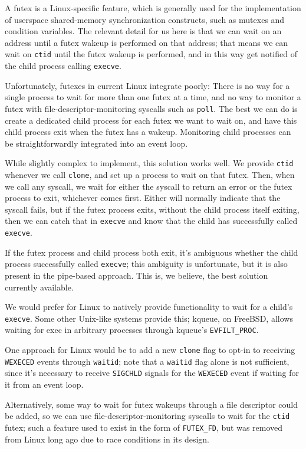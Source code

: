 \documentclass[sigplan]{acmart}
\begin{document}
A futex is a Linux-specific feature,
which is generally used for the implementation of userspace shared-memory synchronization constructs,
such as mutexes and condition variables.
The relevant detail for us here is that we can wait on an address
until a futex wakeup is performed on that address;
that means we can wait on \texttt{ctid} until the futex wakeup is performed,
and in this way get notified of the child process calling \texttt{execve}.

Unfortunately, futexes in current Linux integrate poorly:
There is no way for a single process to wait for more than one futex at a time,
and no way to monitor a futex with file-descriptor-monitoring syscalls such as \texttt{poll}.
The best we can do is create a dedicated child process for each futex we want to wait on,
and have this child process exit when the futex has a wakeup.
Monitoring child processes can be straightforwardly integrated into an event loop.

While slightly complex to implement, this solution works well.
We provide \texttt{ctid} whenever we call \texttt{clone},
and set up a process to wait on that futex.
Then, when we call any syscall,
we wait for either the syscall to return an error or the futex process to exit,
whichever comes first.
Either will normally indicate that the syscall fails,
but if the futex process exits,
without the child process itself exiting,
then we can catch that in \texttt{execve} and know that the child has successfully called \texttt{execve}.

If the futex process and child process both exit,
it's ambiguous whether the child process successfully called \texttt{execve};
this ambiguity is unfortunate, but it is also present in the pipe-based approach.
This is, we believe, the best solution currently available.

We would prefer for Linux to natively provide functionality to wait for a child's \texttt{execve}.
Some other Unix-like systems provide this;
kqueue, on FreeBSD, allows waiting for exec in arbitrary processes through kqueue's \verb|EVFILT_PROC|.

One approach for Linux would be to add a new \texttt{clone} flag to
opt-in to receiving \texttt{WEXECED} events through \texttt{waitid};
note that a \texttt{waitid} flag alone is not sufficient,
since it's necessary to receive \texttt{SIGCHLD} signals for the \texttt{WEXECED} event if waiting for it from an event loop.

Alternatively, some way to wait for futex wakeups through a file descriptor could be added,
so we can use file-descriptor-monitoring syscalls to wait for the \texttt{ctid} futex;
such a feature used to exist in the form of \verb|FUTEX_FD|,
but was removed from Linux long ago due to race conditions in its design.
\end{document}
